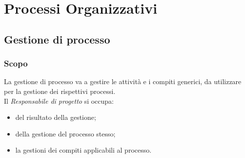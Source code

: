 \section{Processi Organizzativi}
\subsection{Gestione di processo}
\subsubsection{Scopo}
La gestione di processo va a gestire le attività e i compiti generici, da utilizzare per la gestione dei rispettivi processi.\\
Il \textit{Responsabile di progetto} si occupa:
\begin{itemize}
    \item del risultato della gestione;
    \item della gestione del processo stesso;
    \item la gestioni dei compiti applicabili al processo.
\end{itemize}

